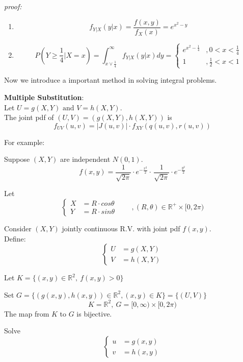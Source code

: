 \documentclass{article}
\begin{document}
\emph{proof:}

\begin{enumerate}
    \item \[ f_{Y|X}(y|x) = \frac{f(x,y)}{f_{X}(x)} = e^{x^{2} - y} \]
    \item \[ P(Y\geq \frac{1}{4} | X=x) = \int_{x \vee \frac{1}{4}}^{\infty} f_{Y|X}(y|x) dy = \begin{cases}
        e^{x^{2} - \frac{1}{4}} &, 0<x<\frac{1}{4}\\
        1 &, \frac{1}{2} <x<1
    \end{cases}\]
\end{enumerate}

\bigskip
Now we introduce a important method in solving integral problems.

\begin{theorem}
    \textbf{Multiple Substitution}:\\
    Let $U = g(X,Y) \text{ and } V = h(X,Y)$.\\
    The joint pdf of $(U,V) = (g(X,Y),h(X,Y))$ is 
\[ f_{UV}(u,v) = |J(u,v)| \cdot f_{XY}(q(u,v),r(u,v)) \]
\end{theorem}
For example: 

Suppose $(X,Y)$ are independent $N(0,1)$.
\[ f(x,y) = \frac{1}{\sqrt{2 \pi}} \cdot e^{-\frac{x^{2}}{2}} \cdot \, \frac{1}{\sqrt{2 \pi}} \cdot e^{-\frac{y^{2}}{2}} \]

Let 
\[
\left\{
    \begin{aligned}
        X &= R \cdot cos \theta\\
        Y &= R \cdot sin \theta
    \end{aligned}
\right.
\qquad ,(R,\theta) \in \mathbb{R}^{+} \times [0,2\pi)
\]

Consider $(X,Y)$ jointly continuous R.V. with joint pdf $f(x,y)$.\\
Define:
\[
\left\{
    \begin{aligned}
        U &= g(X,Y)\\
        V &= h(X,Y)
    \end{aligned}
\right.
\]

Let $K = \{ (x,y) \in \mathbb{R}^{2}, \ f(x,y) > 0 \}$

Set $G = \{ (g(x,y),h(x,y)) \in \mathbb{R}^{2}, (x,y) \in K \} = \{ (U,V) \}$
\[ K=\mathbb{R}^{2},\ G=[0,\infty) \times [0,2\pi) \] The map from $K$ to $G$ is bijective.

Solve
\[
\left\{
    \begin{aligned}
        u &= g(x,y)\\
        v &= h(x,y)
    \end{aligned}
\right.
\]
\end{document}
